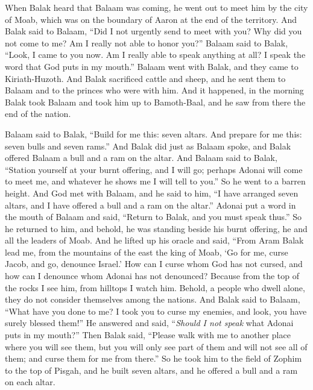 \begin{biblechapter}
\verse When Balak heard that Balaam was coming, he went out to meet him by the city of Moab, which was on the boundary of Aaron at the end of the territory.
\verse And Balak said to Balaam, “Did I not urgently send to meet with you? Why did you not come to me? Am I really not able to honor you?”
\verse Balaam said to Balak, “Look, I came to you now. Am I really able to speak anything at all? I speak the word that God puts in my mouth.”
\verse Balaam went with Balak, and they came to Kiriath-Huzoth.
\verse And Balak sacrificed cattle and sheep, and he sent them to Balaam and to the princes who were with him.
\verse And it happened, in the morning Balak took Balaam and took him up to Bamoth-Baal, and he saw from there the end of the nation.
\end{biblechapter}

\begin{biblechapter} %
 Balaam said to Balak, “Build for me this: seven altars. And prepare for me this: seven bulls and seven rams.”
\verse And Balak did just as Balaam spoke, and Balak offered Balaam a bull and a ram on the altar.
\verse And Balaam said to Balak, “Station yourself at your burnt offering, and I will go; perhaps Adonai will come to meet me, and whatever he shows me I will tell to you.” So he went to a barren height.
\verse And God met with Balaam, and he said to him, “I have arranged seven altars, and I have offered a bull and a ram on the altar.”
\verse Adonai put a word in the mouth of Balaam and said, “Return to Balak, and you must speak thus.”
\verse So he returned to him, and behold, he was standing beside his burnt offering, he and all the leaders of Moab.
\verse And he lifted up his oracle and said,
\verse “From Aram Balak lead me, 
from the mountains of the east the king of Moab, 
‘Go for me, curse Jacob, 
and go, denounce Israel.’
\verse How can I curse whom God has not cursed, 
and how can I denounce whom Adonai has not denounced?
\verse Because from the top of the rocks I see him, 
from hilltops I watch him. 
Behold, a people who dwell alone, 
they do not consider themselves among the nations.
\verse And Balak said to Balaam, “What have you done to me? I took you to curse my enemies, and look, you have surely blessed them!”
\verse He answered and said, “\textit{Should I not speak} what Adonai puts in my mouth?”
\verse Then Balak said, “Please walk with me to another place where you will see them, but you will only see part of them and will not see all of them; and curse them for me from there.”
\verse So he took him to the field of Zophim to the top of Pisgah, and he built seven altars, and he offered a bull and a ram on each altar.

\end{biblechapter}
